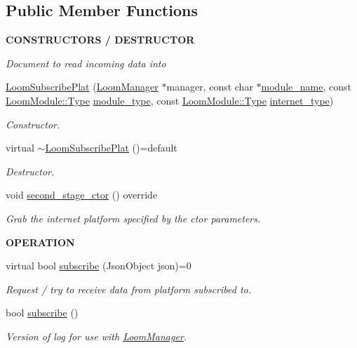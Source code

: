 \subsection*{Public Member Functions}
\begin{Indent}{\bf C\+O\+N\+S\+T\+R\+U\+C\+T\+O\+RS / D\+E\+S\+T\+R\+U\+C\+T\+OR}\par
{\em Document to read incoming data into }\begin{DoxyCompactItemize}
\item 
\hyperlink{class_loom_subscribe_plat_a940e8602c9a6d8b8b7af17f3e68dd704}{Loom\+Subscribe\+Plat} (\hyperlink{class_loom_manager}{Loom\+Manager} $\ast$manager, const char $\ast$\hyperlink{class_loom_module_adf6e68ad7e9fa2acfca7a8a280680764}{module\+\_\+name}, const \hyperlink{class_loom_module_aee91d0a75140d51ee428fc2d4417d865}{Loom\+Module\+::\+Type} \hyperlink{class_loom_module_a152d394f37236a2b159dae19da67eeb0}{module\+\_\+type}, const \hyperlink{class_loom_module_aee91d0a75140d51ee428fc2d4417d865}{Loom\+Module\+::\+Type} \hyperlink{class_loom_subscribe_plat_ac1f89a414dd68151b156c3d76a5cbffe}{internet\+\_\+type})
\begin{DoxyCompactList}\small\item\em Constructor. \end{DoxyCompactList}\item 
virtual \hyperlink{class_loom_subscribe_plat_a364ceafa947e0b761021ce50730964a3}{$\sim$\+Loom\+Subscribe\+Plat} ()=default
\begin{DoxyCompactList}\small\item\em Destructor. \end{DoxyCompactList}\item 
void \hyperlink{class_loom_subscribe_plat_a5394d492cec0f9403d0442ea46bce2db}{second\+\_\+stage\+\_\+ctor} () override
\begin{DoxyCompactList}\small\item\em Grab the internet platform specified by the ctor parameters. \end{DoxyCompactList}\end{DoxyCompactItemize}
\end{Indent}
\begin{Indent}{\bf O\+P\+E\+R\+A\+T\+I\+ON}\par
\begin{DoxyCompactItemize}
\item 
virtual bool \hyperlink{class_loom_subscribe_plat_ad80fe04ecc6d8d1c2c5f093b9c4e9b72}{subscribe} (Json\+Object json)=0
\begin{DoxyCompactList}\small\item\em Request / try to receive data from platform subscribed to. \end{DoxyCompactList}\item 
bool \hyperlink{class_loom_subscribe_plat_a005ab2acc545abbdcbc6a44dadb11abb}{subscribe} ()
\begin{DoxyCompactList}\small\item\em Version of log for use with \hyperlink{class_loom_manager}{Loom\+Manager}. \end{DoxyCompactList}\end{DoxyCompactItemize}
\end{Indent}
